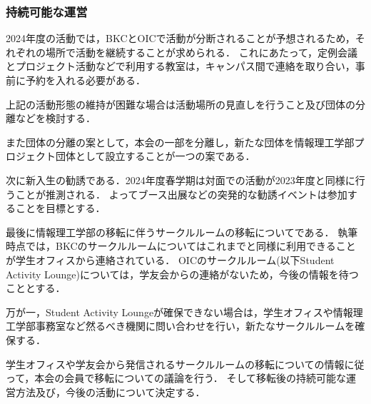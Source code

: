 \subsubsection*{持続可能な運営}
2024年度の活動では，BKCとOICで活動が分断されることが予想されるため，それぞれの場所で活動を継続することが求められる．
これにあたって，定例会議とプロジェクト活動などで利用する教室は，キャンパス間で連絡を取り合い，事前に予約を入れる必要がある．

上記の活動形態の維持が困難な場合は活動場所の見直しを行うこと及び団体の分離などを検討する．

また団体の分離の案として，本会の一部を分離し，新たな団体を情報理工学部プロジェクト団体として設立することが一つの案である．

次に新入生の勧誘である．2024年度春学期は対面での活動が2023年度と同様に行うことが推測される．
よってブース出展などの突発的な勧誘イベントは参加することを目標とする．

最後に情報理工学部の移転に伴うサークルルームの移転についてである．
執筆時点では，BKCのサークルルームについてはこれまでと同様に利用できることが学生オフィスから連絡されている．
OICのサークルルーム(以下Student Activity Lounge)については，学友会からの連絡がないため，今後の情報を待つこととする．

万が一，Student Activity Loungeが確保できない場合は，学生オフィスや情報理工学部事務室など然るべき機関に問い合わせを行い，新たなサークルルームを確保する．

学生オフィスや学友会から発信されるサークルルームの移転についての情報に従って，本会の会員で移転についての議論を行う．
そして移転後の持続可能な運営方法及び，今後の活動について決定する．
